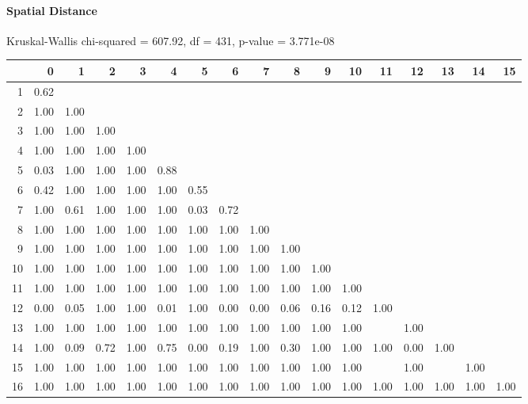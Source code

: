 \paragraph{Spatial Distance}
Kruskal-Wallis chi-squared = 607.92, df = 431, p-value = 3.771e-08

% 
\begin{tabular}{rrrrrrrrrrrrrrrrr}
  \hline
 & 0 & 1 & 2 & 3 & 4 & 5 & 6 & 7 & 8 & 9 & 10 & 11 & 12 & 13 & 14 & 15 \\ 
  \hline
1 & 0.62 &  &  &  &  &  &  &  &  &  &  &  &  &  &  &  \\ 
  2 & 1.00 & 1.00 &  &  &  &  &  &  &  &  &  &  &  &  &  &  \\ 
  3 & 1.00 & 1.00 & 1.00 &  &  &  &  &  &  &  &  &  &  &  &  &  \\ 
  4 & 1.00 & 1.00 & 1.00 & 1.00 &  &  &  &  &  &  &  &  &  &  &  &  \\ 
  5 & 0.03 & 1.00 & 1.00 & 1.00 & 0.88 &  &  &  &  &  &  &  &  &  &  &  \\ 
  6 & 0.42 & 1.00 & 1.00 & 1.00 & 1.00 & 0.55 &  &  &  &  &  &  &  &  &  &  \\ 
  7 & 1.00 & 0.61 & 1.00 & 1.00 & 1.00 & 0.03 & 0.72 &  &  &  &  &  &  &  &  &  \\ 
  8 & 1.00 & 1.00 & 1.00 & 1.00 & 1.00 & 1.00 & 1.00 & 1.00 &  &  &  &  &  &  &  &  \\ 
  9 & 1.00 & 1.00 & 1.00 & 1.00 & 1.00 & 1.00 & 1.00 & 1.00 & 1.00 &  &  &  &  &  &  &  \\ 
  10 & 1.00 & 1.00 & 1.00 & 1.00 & 1.00 & 1.00 & 1.00 & 1.00 & 1.00 & 1.00 &  &  &  &  &  &  \\ 
  11 & 1.00 & 1.00 & 1.00 & 1.00 & 1.00 & 1.00 & 1.00 & 1.00 & 1.00 & 1.00 & 1.00 &  &  &  &  &  \\ 
  12 & 0.00 & 0.05 & 1.00 & 1.00 & 0.01 & 1.00 & 0.00 & 0.00 & 0.06 & 0.16 & 0.12 & 1.00 &  &  &  &  \\ 
  13 & 1.00 & 1.00 & 1.00 & 1.00 & 1.00 & 1.00 & 1.00 & 1.00 & 1.00 & 1.00 & 1.00 &  & 1.00 &  &  &  \\ 
  14 & 1.00 & 0.09 & 0.72 & 1.00 & 0.75 & 0.00 & 0.19 & 1.00 & 0.30 & 1.00 & 1.00 & 1.00 & 0.00 & 1.00 &  &  \\ 
  15 & 1.00 & 1.00 & 1.00 & 1.00 & 1.00 & 1.00 & 1.00 & 1.00 & 1.00 & 1.00 & 1.00 &  & 1.00 &  & 1.00 &  \\ 
  16 & 1.00 & 1.00 & 1.00 & 1.00 & 1.00 & 1.00 & 1.00 & 1.00 & 1.00 & 1.00 & 1.00 & 1.00 & 1.00 & 1.00 & 1.00 & 1.00 \\ 
   \hline
\end{tabular}
